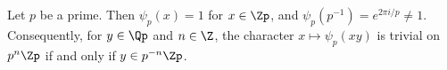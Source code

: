 Let $p$ be a prime. Then $\psi_p(x)=1$ for $x\in\Zp$, and $\psi_p(p^{-1})=e^{2\pi i/p}\neq1$. Consequently, for
$y\in\Qp$ and $n\in\Z$, the character $x\mapsto\psi_p(xy)$ is trivial on $p^n\Zp$ if and only if $y\in p^{-n}\Zp$.
